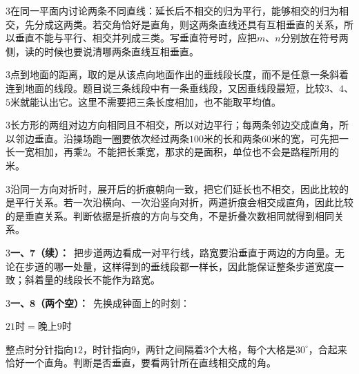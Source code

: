 \documentclass[multi=snippet,border={5bp 20bp 5bp 5bp}]{standalone}
\newenvironment{snippet}[3]{\begin{minipage}{#1bp}\color{answerred}\fontsize{#2}{#3}\selectfont\raggedright}{\end{minipage}}
\begin{document}
\begin{snippet}{505}{11.5}{14}\begin{multicols}{3}\raggedcolumns 在同一平面内讨论两条不同直线：延长后不相交的归为平行，能够相交的归为相交，先分成这两类。若交角恰好是直角，则这两条直线还具有互相垂直的关系，所以垂直不能与平行、相交并列成三类。写垂直符号时，应把\(m\)\allowbreak 、\(n\)\allowbreak 分别放在符号两侧，读的时候也要说清哪两条直线互相垂直。\end{multicols}\end{snippet}
\begin{snippet}{505}{11.5}{14}\begin{multicols}{3}\raggedcolumns 点到地面的距离，取的是从该点向地面作出的垂线段长度，而不是任意一条斜着连到地面的线段。题目说三条线段中有一条垂线段，又因垂线段最短，比较\(3\)\allowbreak 、\(4\)\allowbreak 、\(5\)\allowbreak 米就能认出它。这里不需要把三条长度相加，也不能取平均值。\end{multicols}\end{snippet}
\begin{snippet}{505}{11.5}{14}\begin{multicols}{3}\raggedcolumns 长方形的两组对边方向相同且不相交，所以对边平行；每两条邻边交成直角，所以邻边垂直。沿操场跑一圈要依次经过两条\(100\)\allowbreak 米的长和两条\(60\)\allowbreak 米的宽，可先把一长一宽相加，再乘\(2\)\allowbreak 。不能把长乘宽，那求的是面积，单位也不会是路程所用的米。\end{multicols}\end{snippet}
\begin{snippet}{505}{11.5}{14}\begin{multicols}{3}\raggedcolumns 沿同一方向对折时，展开后的折痕朝向一致，把它们延长也不相交，因此比较的是平行关系。若一次沿横向、一次沿竖向对折，两道折痕会相交成直角，因此比较的是垂直关系。判断依据是折痕的方向与交角，不是折叠次数相同就得到相同关系。\end{multicols}\end{snippet}
\begin{snippet}{505}{11.5}{14}\begin{multicols}{3}\raggedcolumns \textbf{一、7（续）：}\ 把步道两边看成一对平行线，路宽要沿垂直于两边的方向量。无论在步道的哪一处量，这样得到的垂线段都一样长，因此能保证整条步道宽度一致；斜着量的线段长不能作为路宽。\end{multicols}\end{snippet}
\begin{snippet}{505}{11.5}{14}\begin{multicols}{3}\raggedcolumns \textbf{一、8（两个空）：}\ 先换成钟面上的时刻：\par\noindent\(\displaystyle 21\text{时}=\text{晚上}9\text{时}\)\allowbreak \par 整点时分针指向\(12\)\allowbreak ，时针指向\(9\)\allowbreak ，两针之间隔着\(3\)\allowbreak 个大格，每个大格是\(30^\circ\)\allowbreak ，合起来恰好一个直角。判断是否垂直，要看两针所在直线相交成的角。\end{multicols}\end{snippet}
\end{document}
